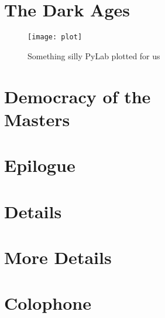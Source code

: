 \documentclass[11pt]{book}
\begin{document}
\chapter{The Dark Ages}
\lipsum[1-2]
\begin{figure}[t]
\centering
\texttt{[image: plot]}
\caption{Something silly PyLab plotted for us}
\end{figure}
\lipsum[3-8]

\chapter[Democracy of the Masters]{Democracy of the\\Masters}
\lipsum[1-10]

\chapter{Epilogue}
\blindmathpaper

\appendix

\chapter{Details}
\lipsum[2-5]

\chapter{More Details}
\lipsum[4-9]

\backmatter

\newpage
{}
{}
{}

%
%
%

\chapter*{Colophone}
\lipsum[2]

\clearpage
{}
\printindex
\end{document}
